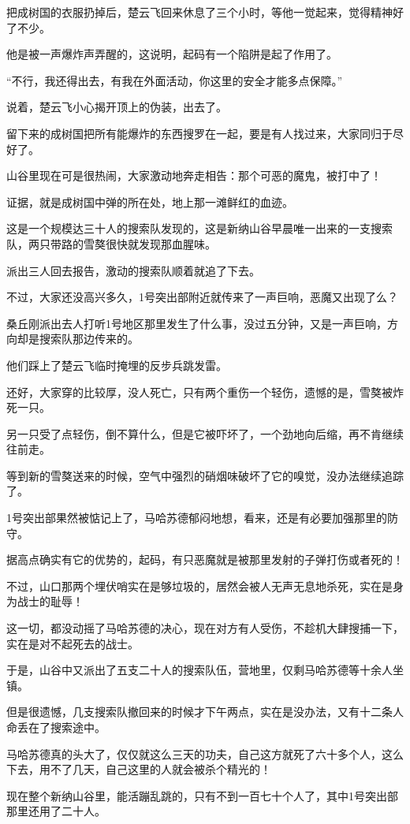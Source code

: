 把成树国的衣服扔掉后，楚云飞回来休息了三个小时，等他一觉起来，觉得精神好了不少。

他是被一声爆炸声弄醒的，这说明，起码有一个陷阱是起了作用了。

“不行，我还得出去，有我在外面活动，你这里的安全才能多点保障。”

说着，楚云飞小心揭开顶上的伪装，出去了。

留下来的成树国把所有能爆炸的东西搜罗在一起，要是有人找过来，大家同归于尽好了。

山谷里现在可是很热闹，大家激动地奔走相告：那个可恶的魔鬼，被打中了！

证据，就是成树国中弹的所在处，地上那一滩鲜红的血迹。

这是一个规模达三十人的搜索队发现的，这是新纳山谷早晨唯一出来的一支搜索队，两只带路的雪獒很快就发现那血腥味。

派出三人回去报告，激动的搜索队顺着就追了下去。

不过，大家还没高兴多久，1号突出部附近就传来了一声巨响，恶魔又出现了么？

桑丘刚派出去人打听1号地区那里发生了什么事，没过五分钟，又是一声巨响，方向却是搜索队那边传来的。

他们踩上了楚云飞临时掩埋的反步兵跳发雷。

还好，大家穿的比较厚，没人死亡，只有两个重伤一个轻伤，遗憾的是，雪獒被炸死一只。

另一只受了点轻伤，倒不算什么，但是它被吓坏了，一个劲地向后缩，再不肯继续往前走。

等到新的雪獒送来的时候，空气中强烈的硝烟味破坏了它的嗅觉，没办法继续追踪了。

1号突出部果然被惦记上了，马哈苏德郁闷地想，看来，还是有必要加强那里的防守。

据高点确实有它的优势的，起码，有只恶魔就是被那里发射的子弹打伤或者死的！

不过，山口那两个埋伏哨实在是够垃圾的，居然会被人无声无息地杀死，实在是身为战士的耻辱！

这一切，都没动摇了马哈苏德的决心，现在对方有人受伤，不趁机大肆搜捕一下，实在是对不起死去的战士。

于是，山谷中又派出了五支二十人的搜索队伍，营地里，仅剩马哈苏德等十余人坐镇。

但是很遗憾，几支搜索队撤回来的时候才下午两点，实在是没办法，又有十二条人命丢在了搜索途中。

马哈苏德真的头大了，仅仅就这么三天的功夫，自己这方就死了六十多个人，这么下去，用不了几天，自己这里的人就会被杀个精光的！

现在整个新纳山谷里，能活蹦乱跳的，只有不到一百七十个人了，其中1号突出部那里还用了二十人。

